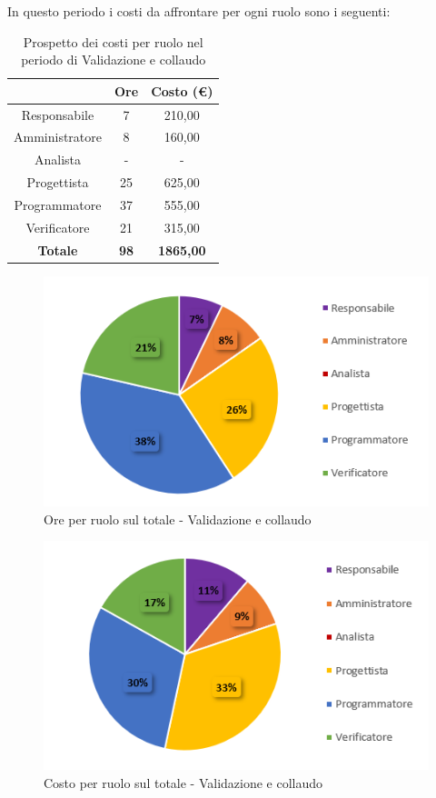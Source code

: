 \pagebreak
   In questo periodo i costi da affrontare per ogni ruolo sono i seguenti:
   
   \begin{table}[H]
       \centering
       \renewcommand{\arraystretch}{1.8}
       \begin{tabular}{c|c|c}
         \rowcolor[HTML]{125E28} 
         \multicolumn{1}{c}{\color[HTML]{FFFFFF}\textbf{Ruolo}}
         & \multicolumn{1}{c}{\color[HTML]{FFFFFF}\textbf{Ore}}
         & \multicolumn{1}{c}{\color[HTML]{FFFFFF}\textbf{Costo (€)}}\\
         \hline
         Responsabile   & 7 & 210,00\\
         Amministratore & 8 & 160,00\\
         Analista       & - & -\\
         Progettista    & 25 & 625,00\\
         Programmatore  & 37 & 555,00\\
         Verificatore   & 21 & 315,00\\
         \textbf{Totale} & \textbf{98} & \textbf{1865,00}
       \end{tabular}
       \caption{Prospetto dei costi per ruolo nel periodo di Validazione e collaudo}
     \end{table}
   
     \begin{figure}[H]
       \centering
        \includegraphics[scale=0.8]{immagini/ore_ruolo_Validazione.png}
        \caption{Ore per ruolo sul totale - Validazione e collaudo}
      \end{figure}
   
     \begin{figure}[H]
       \centering
        \includegraphics[scale=0.8]{immagini/costo_ruolo_validazione.png}
        \caption{Costo per ruolo sul totale - Validazione e collaudo}
      \end{figure}
   
